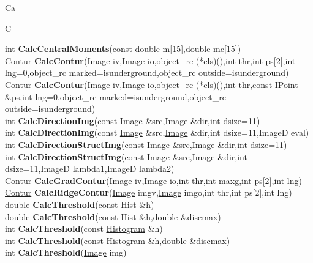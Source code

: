 \documentclass[10pt,titlepage]{article}
\def\functionlistentry#1#2#3#4#5#6{\noindent #1 {\bf #2}(#3) \dotfill #6\\}
\def\letterref#1{}
\def\letterlabel#1{\vspace{0.5cm}\centerline{\Large #1}}
\def\letterlabelend#1{}
\begin{document}
{{\letterlabel{Ca}
\letterlabel{C}
\letterref{A}
\letterref{B}
\letterref{C}
\letterref{D}
\letterref{E}
\letterref{F}
\letterref{G}
\letterref{H}
\letterref{I}
\letterref{K}
\letterref{L}
\letterref{M}
\letterref{N}
\letterref{O}
\letterref{P}
\letterref{Q}
\letterref{R}
\letterref{S}
\letterref{T}
\letterref{U}
\letterref{V}
\letterref{W}
\letterref{X}
\letterref{Y}
\letterref{Z}

\letterref{Ca}
\letterref{Ce}
\letterref{Ch}
\letterref{Ci}
\letterref{Cl}
\letterref{Co}
\letterref{Cr}
\letterref{Cu}
\letterlabelend{Ca}
\functionlistentry{int}{CalcCentralMoments}{const double m[15],double mc[15]}{1613}{obsolet}{}
\functionlistentry{\hyperlink{Contur}{Contur}}{CalcContur}{\hyperlink{Image}{Image} iv,\hyperlink{Image}{Image} io,object\_rc (*cls)(),int thr,int ps[2],int lng=0,object\_rc marked=isunderground,object\_rc outside=isunderground}{440}{conturs}{}
\functionlistentry{\hyperlink{Contur}{Contur}}{CalcContur}{\hyperlink{Image}{Image} iv,\hyperlink{Image}{Image} io,object\_rc (*cls)(),int thr,const IPoint \&ps,int lng=0,object\_rc marked=isunderground,object\_rc outside=isunderground}{441}{conturs}{}
\functionlistentry{int}{CalcDirectionImg}{const \hyperlink{Image}{Image} \&src,\hyperlink{Image}{Image} \&dir,int dsize=11}{360}{filter}{}
\functionlistentry{int}{CalcDirectionImg}{const \hyperlink{Image}{Image} \&src,\hyperlink{Image}{Image} \&dir,int dsize=11,ImageD eval}{361}{filter}{}
\functionlistentry{int}{CalcDirectionStructImg}{const \hyperlink{Image}{Image} \&src,\hyperlink{Image}{Image} \&dir,int dsize=11}{362}{filter}{}
\functionlistentry{int}{CalcDirectionStructImg}{const \hyperlink{Image}{Image} \&src,\hyperlink{Image}{Image} \&dir,int dsize=11,ImageD lambda1,ImageD lambda2}{363}{filter}{}
\functionlistentry{\hyperlink{Contur}{Contur}}{CalcGradContur}{\hyperlink{Image}{Image} iv,\hyperlink{Image}{Image} io,int thr,int maxg,int ps[2],int lng}{449}{conturs}{}
\functionlistentry{\hyperlink{Contur}{Contur}}{CalcRidgeContur}{\hyperlink{Image}{Image} imgv,\hyperlink{Image}{Image} imgo,int thr,int ps[2],int lng}{452}{conturs}{}
\functionlistentry{double}{CalcThreshold}{const \hyperlink{Hist}{Hist} \&h}{432}{conturs}{}
\functionlistentry{double}{CalcThreshold}{const \hyperlink{Hist}{Hist} \&h,double \&discmax}{433}{conturs}{}
\functionlistentry{int}{CalcThreshold}{const \hyperlink{Histogram}{Histogram} \&h}{434}{conturs}{}
\functionlistentry{int}{CalcThreshold}{const \hyperlink{Histogram}{Histogram} \&h,double \&discmax}{435}{conturs}{}
\functionlistentry{int}{CalcThreshold}{\hyperlink{Image}{Image} img}{436}{conturs}{}
}}
\end{document}
